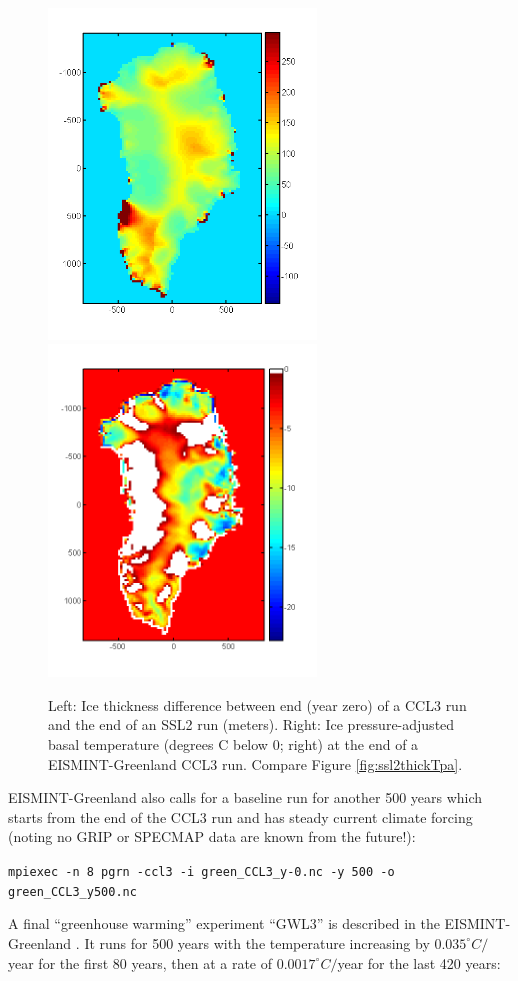 \documentclass[11pt,final]{amsart}
\begin{document}
\begin{figure}[h]
\includegraphics[width=2.8in]{figs/Hdiff_CCLSSL}\quad\includegraphics[width=2.8in]{figs/Tpa_CCL}
\caption{Left:  Ice thickness difference between end (year zero) of a CCL3 run and the end of an SSL2 run (meters).  Right:  Ice pressure-adjusted basal temperature (degrees C below 0; right) at the end of a EISMINT-Greenland CCL3 run.  Compare Figure \ref{fig:ssl2thickTpa}.}
\label{fig:cclthickTpa}
\end{figure}

EISMINT-Greenland also calls for a baseline run for another 500 years which starts from the end of the CCL3 run and has steady current climate forcing (noting no GRIP or SPECMAP data are known from the future!):

\verb|mpiexec -n 8 pgrn -ccl3 -i green_CCL3_y-0.nc -y 500 -o green_CCL3_y500.nc|

A final ``greenhouse warming'' experiment ``GWL3'' is described in the EISMINT-Greenland \cite{RitzEISMINT}.  It runs for 500 years with the temperature increasing by $0.035^\circ C/$year for the first 80 years, then at a rate of $0.0017^\circ C/$year for the last 420 years:
\end{document}

